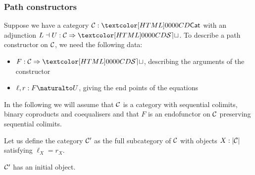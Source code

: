 \subsubsection{Path constructors}
Suppose we have a category $\Cc : \Cat$ with an adjunction
$L \dashv U : \Func{\Cc}{\SET}$. To describe a path constructor
on $\mathcal{C}$, we need the following data:
\begin{itemize}
\item $F : \Func{\Cc}{\SET}$, describing the arguments of the constructor
\item $\ell, r : \Nat{F}{U}$, giving the end points of the equations
\end{itemize}

In the following we will assume that $\mathcal{C}$ is a category with
sequential colimits, binary coproducts and coequalisers and that $F$
is an endofunctor on $\mathcal{C}$ preserving sequential colimits.

Let us define the category $\mathcal{C}'$ as the full subcategory of $\mathcal{C}$
with objects $X : | \mathcal{C} |$ satisfying $\ell_X = r_X$.

\begin{proposition}
  $\mathcal{C}'$ has an initial object.
\end{proposition}

